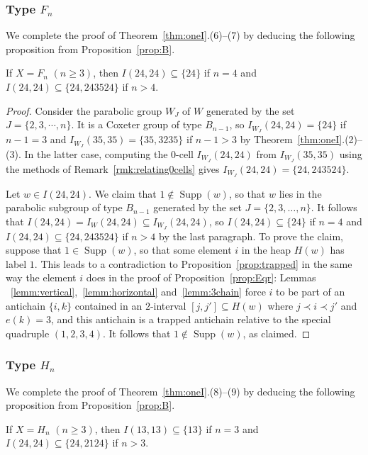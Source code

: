 \documentclass[ALCO,Unicode,published]{cedram}
\newcommand{\se}{\subseteq}
\DeclareMathOperator{\supp}{\mathrm{Supp}}
\begin{document}
\subsubsection{Type $F_n$}
We complete the proof of Theorem~\ref{thm:oneI}.(6)--(7) by deducing the following proposition from Proposition~\ref{prop:B}. 

\begin{prop}
    \label{prop:F}
    If $X=F_n$ $(n\ge 3)$, then $I(24,24)\se \{24\}$ if $n=4$ and $I(24,24)\se \{24,243524\}$ if $n>4$.
\end{prop}

\begin{proof}
  Consider the parabolic group $W_J$ of $W$ generated by the set $J=\{2,3,\cdots, n\}$. It is a
  Coxeter group of type $B_{n-1}$, so $I_{W_J}(24,24)=\{24\}$ if $n-1=3$ and $I_{W_J}(35,35)=\{35,
  3235\}$ if $n-1>3$ by Theorem~\ref{thm:oneI}.(2)--(3). In the latter case, computing the 0-cell
  $I_{W_J}(24,24)$ from $I_{W_J}(35,35)$ using the methods of Remark~\ref{rmk:relating0cells} gives
  $I_{W_J}(24,24)=\{24, 243524\}$. 

  Let $w\in I(24,24)$. We claim that $1\notin \supp(w)$, so that $w$ lies in the parabolic subgroup
  of type $B_{n-1}$ generated by the set $J=\{2,3,\dots,n\}$. It follows that
  $I(24,24)=I_{W}(24,24)\se I_{W_J}(24,24)$, so $I(24,24)\se \{24\}$ if $n=4$ and $I(24,24)\se
  \{24,243524\}$ if $n>4$ by the last paragraph. To prove the claim, suppose that $1\in \supp(w)$,
  so that some element  $i$ in the heap $H(w)$ has label $1$.  This leads to a contradiction to
  Proposition~\ref{prop:trapped} in the same way the element $i$ does in the proof of Proposition~\ref{prop:Eqr}: Lemmas
 ~\ref{lemm:vertical},~\ref{lemm:horizontal} and~\ref{lemm:3chain} force $i$ to be part of an
  antichain $\{i,k\}$ contained in an $2$-interval $[j,j']\se H(w)$ where $j\prec i\prec j'$ and
  $e(k)=3$, and this antichain is a trapped antichain relative to the special quadruple $(1,2,3,4)$.
  It follows that $1\notin \supp(w)$, as claimed.
\end{proof} 


\subsubsection{Type $H_n$}
We complete the proof of Theorem~\ref{thm:oneI}.(8)--(9) by deducing the following proposition from Proposition~\ref{prop:B}. 

\begin{prop}
    \label{prop:H}
    If $X=H_n$ $(n\ge 3)$, then $I(13,13)\se \{13\}$ if $n=3$ and $I(24,24)\se
    \{24,2124\}$ if $n>3$.
\end{prop}
\end{document}

